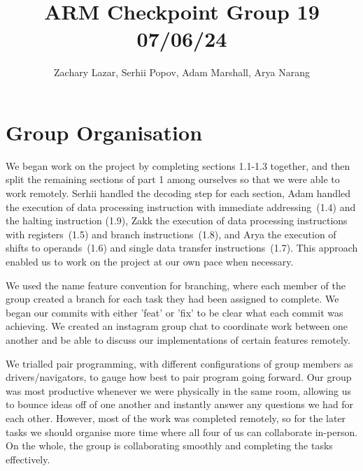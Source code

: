 \documentclass[11pt]{article}
\begin{document}
\title{ARM Checkpoint Group 19 07/06/24}
\author{Zachary Lazar, Serhii Popov, Adam Marshall, Arya Narang}

\maketitle

\section{Group Organisation}
We began work on the project by completing sections 1.1-1.3 together, and then split the remaining sections
of part 1 among ourselves so that we were able to work remotely. Serhii handled the decoding step for each section,
Adam handled the execution of data processing instruction with immediate addressing~(1.4) and the halting instruction (1.9),
Zakk the execution of data processing instructions with registers~(1.5) and branch instructions~(1.8), 
and Arya the execution of shifts to operands~(1.6) and single data transfer instructions~(1.7). This approach
enabled us to work on the project at our own pace when necessary.

We used the name feature convention for branching, where each member of the group created a branch for each task
they had been assigned to complete. We began our commits with either 'feat' or 'fix' to be clear what each commit 
was achieving. We created an instagram group chat to coordinate work between one another and be able to discuss
our implementations of certain features remotely.

We trialled pair programming, with different configurations of group members as drivers/navigators, to gauge
how best to pair program going forward. Our group was most productive whenever we were physically in the same room,
allowing us to bounce ideas off of one another and instantly answer any questions we had for each other. However,
most of the work was completed remotely, so for the later tasks we should organise more time
where all four of us can collaborate in-person. On the whole, the group is collaborating smoothly and completing
the tasks effectively.
\end{document}

